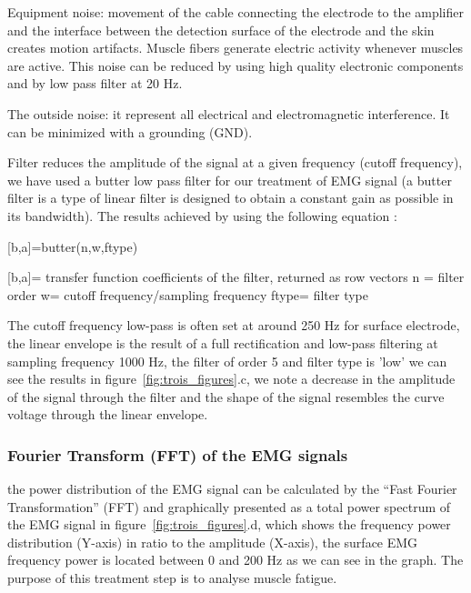 \documentclass[conference]{IEEEtran}
\begin{document}
Equipment noise: movement of the cable connecting the electrode to the amplifier and the interface between the detection surface of the electrode and the skin creates motion artifacts. Muscle fibers generate electric activity whenever muscles are active. This noise can be reduced by using high quality electronic components and by low pass filter at 20 Hz.\par

The outside noise: it represent all electrical and electromagnetic interference. It can be minimized with a grounding (GND).\par

Filter reduces the amplitude of the signal at a given frequency (cutoff frequency), we have used a butter low pass filter for our treatment of EMG signal (a butter filter is a type of linear filter is designed to obtain a constant gain as possible in its bandwidth). The results achieved by using the following equation :

      [b,a]=butter(n,w,ftype)

      [b,a]= transfer function coefficients of the filter, returned as row vectors
      n = filter order
      w= cutoff frequency/sampling frequency
      ftype= filter type \par


The cutoff frequency low-pass is often set at around 250 Hz for surface electrode, the linear envelope is the result of a full rectification and low-pass filtering at sampling frequency 1000 Hz, the filter of order 5 and filter type is 'low' we can see the results in figure~\ref{fig:trois_figures}.c, we note a decrease in the amplitude of the signal through the filter and the shape of the signal resembles the curve voltage through the linear envelope.\par

\subsubsection{Fourier Transform (FFT) of the EMG signals} \label{sub:FourierTransform(FFT)oftheEMGsignals}\par
the power distribution of the EMG signal can be calculated by the “Fast Fourier Transformation” (FFT) and graphically presented as a total power
spectrum of the EMG signal in figure~\ref{fig:trois_figures}.d, which shows the frequency power distribution (Y-axis) in ratio to the amplitude (X-axis), the surface EMG frequency power is located between 0 and 200 Hz as we can see in the graph. The purpose of this treatment step is to analyse muscle fatigue.\par
\end{document}
